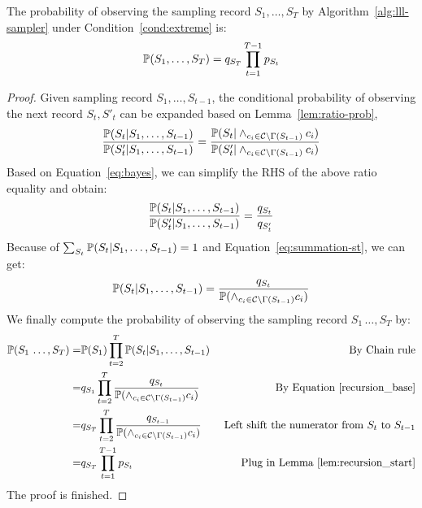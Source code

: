 \begin{lemma} \label{lem:sample-record}
    The probability of observing the sampling record  $S_1,\ldots,S_T$ by Algorithm~\ref{alg:lll-sampler} under Condition~\ref{cond:extreme} is:
    \begin{equation}\label{pS_final}
        \mathbb{P}(S_1,\ldots ,S_T)=q_{S_T} \prod_{t=1}^{T-1} p_{S_t}
    \end{equation}
    \begin{proof}
        Given sampling record  $S_1,\ldots,S_{t-1}$, the conditional probability of observing the next record {$S_t,S'_t$} can be expanded  based on Lemma~\ref{lem:ratio-prob},
        \begin{equation*}
            \frac{\mathbb{P}(S_t | S_1, \ldots, S_{t-1})}{\mathbb{P}(S'_t | S_1, \ldots, S_{t-1})}=\frac{\mathbb{P}(S_t |\wedge_{c_i \in \mathcal{C}\backslash \Gamma(S_{t-1})}c_i)}{\mathbb{P}(S'_t |\wedge_{c_i \in \mathcal{C}\backslash \Gamma(S_{t-1})}c_i)}
        \end{equation*}
        Based on Equation~\eqref{eq:bayes}, we {can simplify the RHS of the above ratio equality and} obtain:
        \begin{equation*}
            \frac{\mathbb{P}(S_t | S_1, \ldots, S_{t-1})}{\mathbb{P}(S'_t | S_1, \ldots, S_{t-1})}=\frac{q_{S_t}}{q_{S'_t}}
        \end{equation*}
        Because of $\sum_{S_t}\mathbb{P}(S_t | S_1, \ldots, S_{t-1})=1$ and Equation~\eqref{eq:summation-st}, we can get:
        \begin{equation}\label{recursion_base}
            \mathbb{P}(S_t | S_1, \ldots, S_{t-1})=  \frac{q_{S_t}}{\mathbb{P}(\wedge_{c_i \in \mathcal{C}\backslash \Gamma(S_{t-1})}c_i)}
        \end{equation}
        We finally compute the probability of observing the sampling record $S_1\,\ldots, S_T$ by:
        \begin{equation*}
            \begin{aligned}
                \mathbb{P}(S_1\,\ldots ,S_T)= & \mathbb{P}(S_1)\prod_{t=2}^T\mathbb{P}(S_t | S_1,\ldots,S_{t-1})                                                        & \text{ By Chain rule}                                    \\
                =                     & q_{S_1}\prod_{t=2}^T \frac{q_{S_t}}{\mathbb{P}(\wedge_{c_i \in \mathcal{C}\backslash \Gamma(S_{t-1})}c_i)}      & \text{ By Equation~\eqref{recursion_base}}               \\
                =                     & q_{S_T} \prod_{t=2}^T \frac{q_{S_{t-1}}}{\mathbb{P}(\wedge_{c_i \in \mathcal{C}\backslash \Gamma(S_{t-1})}c_i)} & \text{ Left shift the numerator from $S_t$ to $S_{t-1}$} \\
                =                     & q_{S_T} \prod_{t=1}^{T-1} p_{S_t}                                                                       & \text{Plug in  Lemma~\ref{lem:recursion_start}}
            \end{aligned}
        \end{equation*}
        The proof is finished.
    \end{proof}
\end{lemma}


